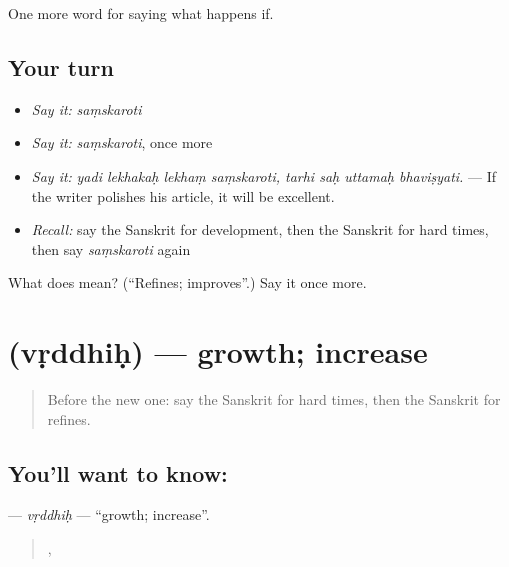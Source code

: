 \begin{grammarlens}[title={What you've built}]
One more word for saying what happens if.
\end{grammarlens}

\subsection*{Your turn}
\begin{itemize}
\raggedright
  \item \emph{Say it:} \emph{saṃskaroti}
  \item \emph{Say it:} \emph{saṃskaroti}, once more
  \item \emph{Say it:} \emph{yadi lekhakaḥ lekhaṃ saṃskaroti, tarhi saḥ uttamaḥ bhaviṣyati.} — If the writer polishes his article, it will be excellent.
  \item \emph{Recall:} say the Sanskrit for development, then the Sanskrit for hard times, then say \emph{saṃskaroti} again
\end{itemize}

\begin{tcolorbox}[breakable,colback=teal!4,colframe=teal!35!black,title={Before you move on}]
What does  mean? (\textquotedblleft{}Refines; improves\textquotedblright{}.) Say it once more.
\end{tcolorbox}
\section[\texorpdfstring{\sk{वृद्धिः} (vṛddhiḥ)}{वृद्धिः (vṛddhiḥ)}]{ (vṛddhiḥ) — growth; increase}

\label{lesson:SA-C387-vrddhih}



\begin{quote}
Before the new one: say the Sanskrit for hard times, then the Sanskrit for refines.
\end{quote}

\subsection*{You'll want to know: }
\textbf{} — \emph{vṛddhiḥ} — \textquotedblleft{}growth; increase\textquotedblright{}.

\begin{quote}
  ,    
\end{quote}

